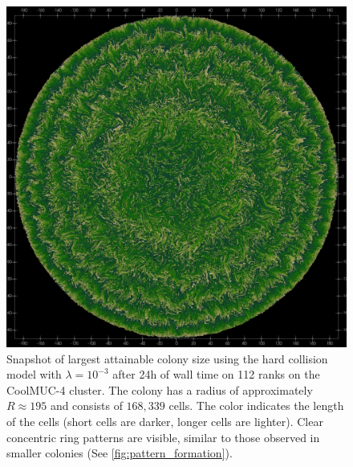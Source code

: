 \documentclass[conference]{IEEEtran}
\begin{document}
\begin{figure}[H]
    \includegraphics[width=\linewidth]{figures/growth/huge.jpeg}

    \caption{Snapshot of largest attainable colony size using the hard collision model with $\lambda=10^{-3}$ after 24h of wall time on 112 ranks on the CoolMUC-4 cluster. The colony has a radius of approximately $R \approx 195$ and consists of $168{,}339$ cells. The color indicates the length of the cells (short cells are darker, longer cells are lighter). Clear concentric ring patterns are visible, similar to those observed in smaller colonies (See \autoref{fig:pattern_formation}).}
    \label{fig:huge_colony_hard}
\end{figure}
\end{document}

